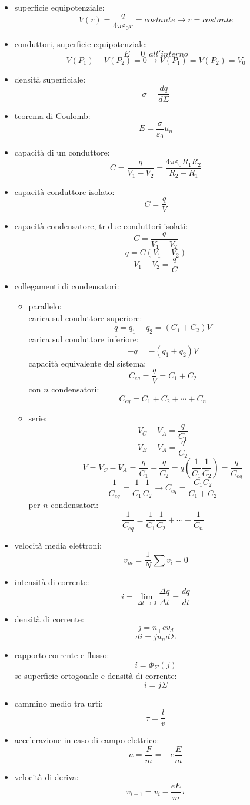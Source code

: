 \documentclass[a4paper,12pt, oneside]{book}
\begin{document}
\begin{itemize}
\item superficie equipotenziale:
$$V(r)=\frac{q}{4\pi\varepsilon_0r}=costante\longrightarrow r=costante$$
\item conduttori, superficie equipotenziale:
$$E=0\,\,\,all'interno$$
$$V(P_1)-V(P_2)=0\longrightarrow V(P_1)=V(P_2)=V_0$$
\item densità superficiale:
$$\sigma=\frac{dq}{d\Sigma}$$
\item teorema di Coulomb:
$$E=\frac{\sigma}{\varepsilon_0}u_n$$
\item capacità di un conduttore:
$$C=\frac{q}{V_1-V_2}=\frac{4\pi\varepsilon_0R_1R_2}{R_2-R_1}$$
\item capacità conduttore isolato:
$$C=\frac{q}{V}$$
\item capacità condensatore, tr due conduttori isolati:
$$C=\frac{q}{V_1-V_2}$$
$$q=C(V_1-V_2)$$
$$V_1-V_2=\frac{q}{C}$$
\item collegamenti di condensatori:
\begin{itemize}
\item parallelo:\\
carica sul conduttore superiore:
$$q=q_1+q_2=(C_1+C_2)V$$
carica sul conduttore inferiore:
$$-q=-(q_1+q_2)V$$
capacità equivalente del sistema:
$$C_{eq}=\frac{q}{V}=C_1+C_2$$
con $n$ condensatori:
$$C_{eq}=C_1+C_2+\cdots+C_n$$
\item serie:
$$V_C-V_A=\frac{q}{C_1}$$
$$V_B-V_A=\frac{q}{C_2}$$
$$V=V_C-V_A=\frac{q}{C_1}+\frac{q}{C_2}=q\left(\frac{1}{C_1}\frac{1}{C_2}\right)=\frac{q}{C_{eq}}$$
$$\frac{1}{C_{eq}}=\frac{1}{C_1}\frac{1}{C_2}\longrightarrow C_{eq}=\frac{C_1C_2}{C_1+C_2}$$
per $n$ condensatori:
$$\frac{1}{C_{eq}}=\frac{1}{C_1}\frac{1}{C_2}+\cdots+\frac{1}{C_n}$$
\end{itemize}
\item velocità media elettroni:
$$v_m=\frac{1}{N}\sum v_i=0$$
\item intensità di corrente:
$$i=\lim_{\Delta t\to 0}\frac{\Delta q}{\Delta t}=\frac{dq}{dt}$$
\item densità di corrente:
$$j=n_+ev_d$$
$$di=ju_nd\Sigma$$
\item rapporto corrente e flusso:
$$i=\Phi_\Sigma(j)$$
se superficie ortogonale e densità di corrente:
$$i=j\Sigma$$
\item cammino medio tra urti:
$$\tau=\frac{l}{v}$$ 
\item accelerazione in caso di campo elettrico:
$$a=\frac{F}{m}=-e\frac{E}{m}$$
\item velocità di deriva:
$$v_{i+1}=v_i-\frac{eE}{m}\tau$$

\end{itemize}
\end{document}
